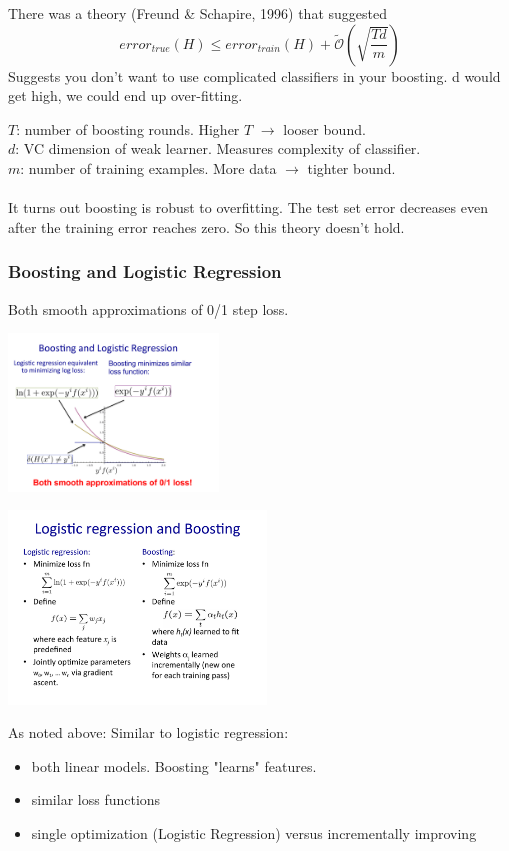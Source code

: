There was a theory (Freund \& Schapire, 1996) that suggested 
$$ error_{true}(H) \leq error_{train}(H) + \tilde{\mathcal{O}} \left( \sqrt{\frac{Td}{m}} \right) $$
Suggests you don't want to use complicated classifiers in your boosting.  d would get high, we could end up over-fitting. %

$T$: number of boosting rounds.  Higher $T$ $\rightarrow$ looser bound.  \hfill \\
$d$: VC dimension of weak learner.  Measures complexity of classifier.  \hfill \\
$m$: number of training examples.  More data $\rightarrow$ tighter bound.  \hfill \\
\hfill \\

It turns out boosting is robust to overfitting.  The test set error decreases even after the training error reaches zero.  So this theory doesn't hold. 

\subsubsection{Boosting and Logistic Regression}
Both smooth approximations of 0/1 step loss.

\includegraphics[width=2.2in]{figures/losses--boosting_and_logistic_regression.pdf}

\includegraphics[width=2.7in]{figures/logistic_regression_and_boosting_summary.pdf}

As noted above:
Similar to logistic regression:
\begin{itemize}
	\item both linear models.  Boosting "learns" features.  
	\item similar loss functions
	\item single optimization (Logistic Regression) versus incrementally improving
\end{itemize} 

